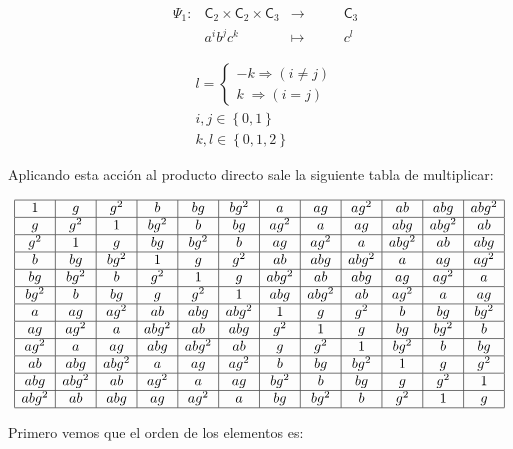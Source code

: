 \documentclass[12pt,a4paper,fleqn,spanish,final,openright]{extbook}
\theoremstyle{definition}
\theoremstyle{remark}
\begin{document}
\begin{flushright}
\begin{align*}
&\Psi_1 : &{{{\mathsf{C}}_{2}}   \times   {{\mathsf{C}}_{2}}}   \times   {{\mathsf{C}}_{3}} &   \longrightarrow    &{{\mathsf{C}}_{3}}\\
&&a^ib^jc^k&   \mapsto \qquad & c^l
\end{align*}


\begin{align*}
&l=
\begin{cases}
-k    \Rightarrow    (i   \neq    j)\\
k \;   \Rightarrow    (i=j)
\end{cases}
\\
& i,j    \in \left\lbrace 0,1 \right\rbrace\\
& k,l    \in \left\lbrace 0,1,2 \right\rbrace
\end{align*}
\end{flushright}

	Aplicando esta acción al producto directo sale la siguiente tabla de multiplicar:


\begin{align*}
\begin{array}{|c|c|c|c|c|c|c|c|c|c|c|c|}
\hline
1&g&g^2&b&bg&bg^2&a&ag&ag^2&ab&abg&abg^2\\
\hline
g&g^2&1&bg^2&b&bg&ag^2&a&ag&abg&abg^2&ab\\
\hline
g^2&1&g&bg&bg^2&b&ag&ag^2&a&abg^2&ab&abg\\
\hline
b&bg&bg^2&1&g&g^2&ab&abg&abg^2&a&ag&ag^2\\
\hline
bg&bg^2&b&g^2&1&g&abg^2&ab&abg&ag&ag^2&a\\
\hline
bg^2&b&bg&g&g^2&1&abg&abg^2&ab&ag^2&a&ag\\
\hline
a&ag&ag^2&ab&abg&abg^2&1&g&g^2&b&bg&bg^2\\
\hline
ag&ag^2&a&abg^2&ab&abg&g^2&1&g&bg&bg^2&b\\
\hline
ag^2&a&ag&abg&abg^2&ab&g&g^2&1&bg^2&b&bg\\
\hline
ab&abg&abg^2&a&ag&ag^2&b&bg&bg^2&1&g&g^2\\
\hline
abg&abg^2&ab&ag^2&a&ag&bg^2&b&bg&g&g^2&1\\
\hline
abg^2&ab&abg&ag&ag^2&a&bg&bg^2&b&g^2&1&g\\
\hline
\end{array}
\end{align*}

Primero vemos que el orden de los elementos es:
\end{document}
